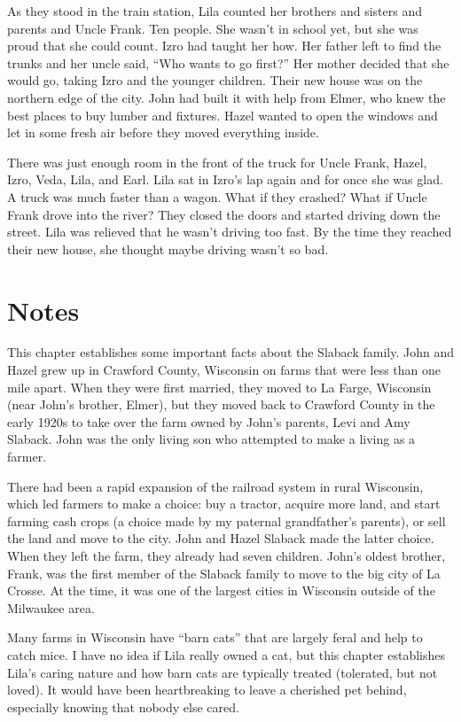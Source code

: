 \documentclass[
  american,
  letterpaper,
]{book}
\begin{document}
As they stood in the train station, Lila counted her brothers and
sisters and parents and Uncle Frank. Ten people. She wasn't in school
yet, but she was proud that she could count. Izro had taught her how.
Her father left to find the trunks and her uncle said, ``Who wants to go
first?'' Her mother decided that she would go, taking Izro and the
younger children. Their new house was on the northern edge of the city.
John had built it with help from Elmer, who knew the best places to buy
lumber and fixtures. Hazel wanted to open the windows and let in some
fresh air before they moved everything inside.

There was just enough room in the front of the truck for Uncle Frank,
Hazel, Izro, Veda, Lila, and Earl. Lila sat in Izro's lap again and for
once she was glad. A truck was much faster than a wagon. What if they
crashed? What if Uncle Frank drove into the river? They closed the doors
and started driving down the street. Lila was relieved that he wasn't
driving too fast. By the time they reached their new house, she thought
maybe driving wasn't so bad.

\section{Notes}\label{notes-2}

This chapter establishes some important facts about the Slaback family.
John and Hazel grew up in Crawford County, Wisconsin on farms that were
less than one mile apart. When they were first married, they moved to La
Farge, Wisconsin (near John's brother, Elmer), but they moved back to
Crawford County in the early 1920s to take over the farm owned by John's
parents, Levi and Amy Slaback. John was the only living son who
attempted to make a living as a farmer.

There had been a rapid expansion of the railroad system in rural
Wisconsin, which led farmers to make a choice: buy a tractor, acquire
more land, and start farming cash crops (a choice made by my paternal
grandfather's parents), or sell the land and move to the city. John and
Hazel Slaback made the latter choice. When they left the farm, they
already had seven children. John's oldest brother, Frank, was the first
member of the Slaback family to move to the big city of La Crosse. At
the time, it was one of the largest cities in Wisconsin outside of the
Milwaukee area.

Many farms in Wisconsin have ``barn cats'' that are largely feral and
help to catch mice. I have no idea if Lila really owned a cat, but this
chapter establishes Lila's caring nature and how barn cats are typically
treated (tolerated, but not loved). It would have been heartbreaking to
leave a cherished pet behind, especially knowing that nobody else cared.
\end{document}
